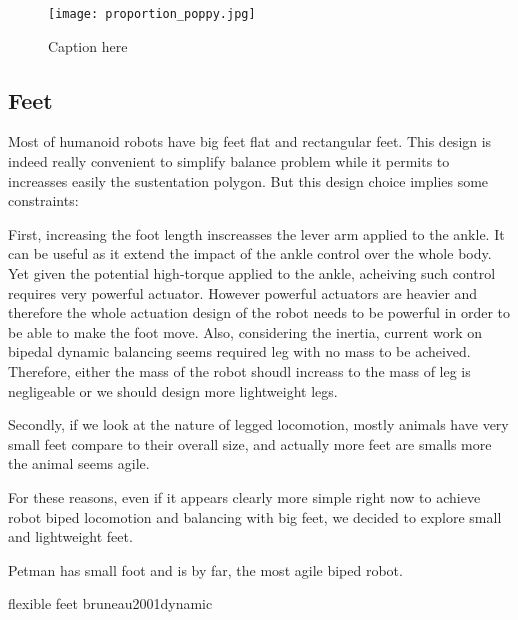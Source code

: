 \begin{figure}[tb]
    \begin{center}
        \texttt{[image: proportion\_poppy.jpg]}
    \end{center}
    \caption{Caption here}
    \label{fig:figure1}
\end{figure}


\subsection{Feet} %

Most of humanoid robots have big feet flat and rectangular feet. This design is indeed really convenient to simplify balance problem while it permits to increasses easily the sustentation polygon.
But this design choice implies some constraints:

First, increasing the foot length inscreasses the lever arm applied to the ankle. It can be useful as it extend the impact of the ankle control over the whole body. Yet given the potential high-torque applied to the ankle, acheiving such control requires very powerful actuator.
However powerful actuators are heavier and therefore the whole actuation design of the robot needs to be powerful in order to be able to make the foot move. Also, considering the inertia, current work on bipedal dynamic balancing seems required leg with no mass to be acheived. Therefore, either the mass of the robot shoudl increass to the mass of leg is negligeable or we should design more lightweight legs.

Secondly, if we look at the nature of legged locomotion, mostly animals have very small feet compare to their overall size, and actually more feet are smalls more the animal seems agile.

For these reasons, even if it appears clearly more simple right now to achieve robot biped locomotion and balancing with big feet, we decided to explore small and lightweight feet.

Petman has small foot and is by far, the most agile biped robot.


flexible feet bruneau2001dynamic
\begin{figure}[tb]
\centering
    \hfil
    \caption{}
    \label{fig:poppy_torso}
\end{figure}





